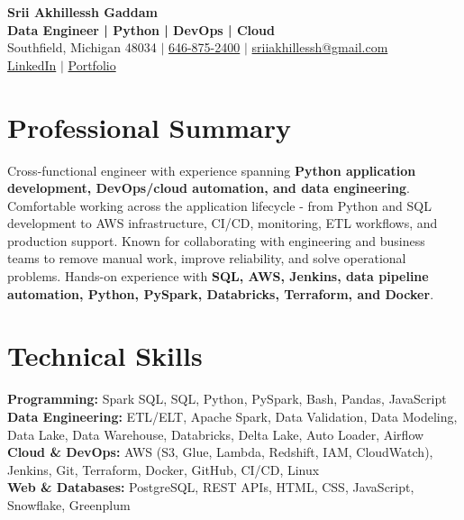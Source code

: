 \documentclass[letterpaper,10pt]{article}
\begin{document}
\fontsize{9.35pt}{10.45pt}\selectfont

\begin{center}
    {\LARGE \textbf{Srii Akhillessh Gaddam}} \\[-1pt]
    \textbf{Data Engineer | Python | DevOps | Cloud} \\[2pt]
    Southfield, Michigan 48034 $|$
    \href{tel:6468752400}{646-875-2400} $|$
    \href{mailto:sriiakhillessh@gmail.com}{sriiakhillessh@gmail.com} \\[1pt]
    \href{https://www.linkedin.com/in/srii-akhiilessh-gaddam-b48668191/}{LinkedIn} $|$
    \href{https://sriiakhillesshg.github.io/portfolio/}{Portfolio}
\end{center}
\vspace{-8pt}

\section{Professional Summary}
\small{Cross-functional engineer with experience spanning \textbf{Python application development, DevOps/cloud automation, and data engineering}. Comfortable working across the application lifecycle - from Python and SQL development to AWS infrastructure, CI/CD, monitoring, ETL workflows, and production support. Known for collaborating with engineering and business teams to remove manual work, improve reliability, and solve operational problems. Hands-on experience with \textbf{SQL, AWS, Jenkins, data pipeline automation, Python, PySpark, Databricks, Terraform, and Docker}.}

\section{Technical Skills}
\small{
\textbf{Programming:} Spark SQL, SQL, Python, PySpark, Bash, Pandas, JavaScript \\
\textbf{Data Engineering:} ETL/ELT, Apache Spark, Data Validation, Data Modeling, Data Lake, Data Warehouse, Databricks, Delta Lake, Auto Loader, Airflow \\
\textbf{Cloud \& DevOps:} AWS (S3, Glue, Lambda, Redshift, IAM, CloudWatch), Jenkins, Git, Terraform, Docker, GitHub, CI/CD, Linux \\
\textbf{Web \& Databases:} PostgreSQL, REST APIs, HTML, CSS, JavaScript, Snowflake, Greenplum
}
\end{document}
